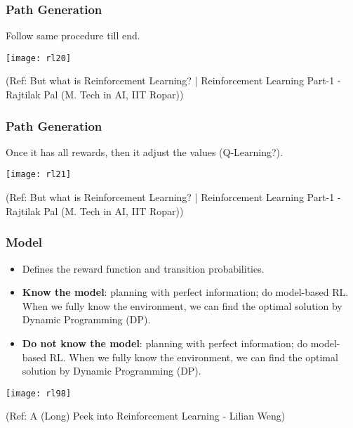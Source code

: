 \begin{frame}[fragile]\frametitle{Path Generation}

Follow same procedure till end. 

\begin{center}
\texttt{[image: rl20]}
\end{center}


{\tiny (Ref: But what is Reinforcement Learning? | Reinforcement Learning Part-1 - Rajtilak Pal (M. Tech in AI, IIT Ropar))}

\end{frame}


\begin{frame}[fragile]\frametitle{Path Generation}

Once it has all rewards, then it adjust the values (Q-Learning?).

\begin{center}
\texttt{[image: rl21]}
\end{center}


{\tiny (Ref: But what is Reinforcement Learning? | Reinforcement Learning Part-1 - Rajtilak Pal (M. Tech in AI, IIT Ropar))}

\end{frame}

\begin{frame}[fragile]\frametitle{Model}


\begin{itemize}
\item Defines the reward function and transition probabilities.
\item {\bf Know the model}: planning with perfect information; do model-based RL. When we fully know the
environment, we can find the optimal solution by Dynamic Programming (DP).
\item {\bf Do not know the model}: planning with perfect information; do model-based RL. When we fully know the
environment, we can find the optimal solution by Dynamic Programming (DP).
\end{itemize}


\begin{center}
\texttt{[image: rl98]}
\end{center}


{\tiny (Ref: A (Long) Peek into Reinforcement Learning - Lilian Weng)}


\end{frame}

